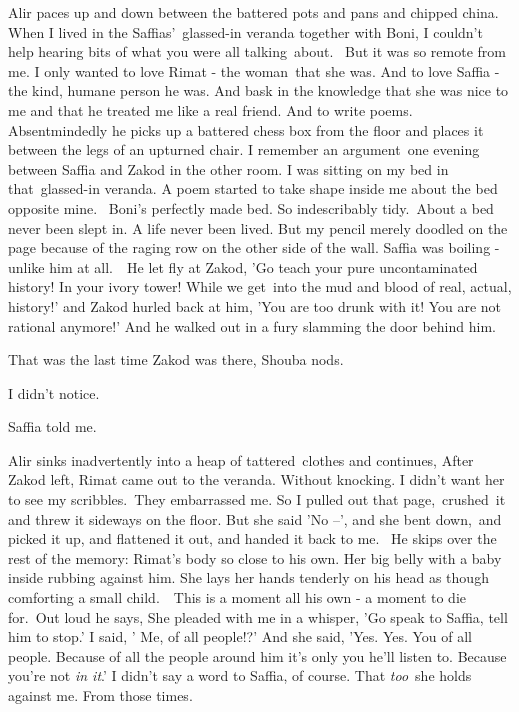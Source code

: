 \documentclass[letterpaper]{article}
\begin{document}
Alir paces up and down between the battered pots and pans and chipped china. {\textquotedbl}When I lived in the
Saffias'\ glassed-in veranda together with Boni, I couldn't help hearing bits of what you were all talking~about.~ But
it was so remote from me. I only wanted to love Rimat - the woman\ that she was. And to love Saffia - the kind, humane
person he was. And bask in the knowledge that she was nice to me and that he treated me like a real friend. And to
write poems.{\textquotedbl} Absentmindedly he picks up a battered chess box from the floor and places it between the
legs of an upturned chair. {\textquotedbl}I remember an argument~one evening between Saffia and Zakod in the other
room. I was sitting on my bed in that\ glassed-in veranda. A poem started to take shape inside me about the bed
opposite mine.~ Boni's perfectly made bed. So indescribably tidy.\ About a bed never been slept in. A life never been
lived. But my pencil merely doodled on the page because of the raging row on the other side of the wall. Saffia was
boiling - unlike him at all.\ \ He let fly at Zakod, 'Go teach your pure uncontaminated history! In your ivory tower!
While we get~into the mud and blood of real, actual, history!' and Zakod hurled back at him, 'You are too drunk with
it! You are not rational anymore!{}' And he walked out in a fury slamming the door behind him.{\textquotedbl}\ 

{\textquotedbl}That was the last time Zakod was there,{\textquotedbl} Shouba nods.

{\textquotedbl}I didn't notice.{\textquotedbl} 

{\textquotedbl}Saffia told me.{\textquotedbl}

Alir sinks inadvertently into a heap of tattered~clothes and continues, {\textquotedbl}After Zakod left, Rimat came out
to the veranda. Without knocking. I didn't want her to see my scribbles.\ They embarrassed me. So I pulled out that
page,\ crushed\ it and threw it sideways on the floor. But she said 'No --', and she bent down,\ and picked it up, and
flattened it out, and handed it back to me.{\textquotedbl}~ He skips over the rest of the memory: Rimat's body so close
to his own. Her big belly with a baby inside rubbing against him. She lays her hands tenderly on his head as though
comforting a small child.\ \ This is a moment all his own - a moment to die for.\ Out loud he says, {\textquotedbl}She
pleaded with me in a whisper, 'Go speak to Saffia, tell him to stop.' I said, ' Me, of all people!?' And she said,
'Yes. Yes. You of all people. Because of all the people around him it's only you he'll listen to. Because you're not
\textit{in it}.' I didn't say a word to Saffia, of course. That \textit{too}\ she holds against me. From those
times.{\textquotedbl} 
\end{document}
